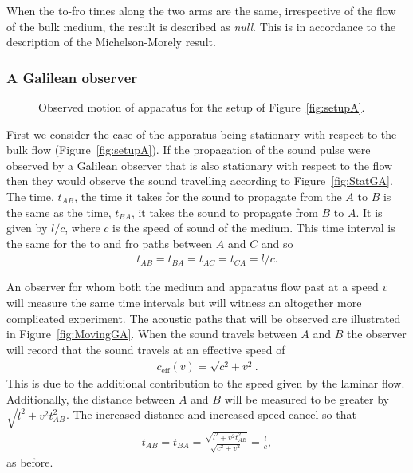 \documentclass[10pt, fleqn,final,showtrims,oldfontcommands, article,a4paper,oneside]{memoir} %
\newcommand{\figref}[1]{Figure~\ref{fig:#1}}
\newcommand{\eff}{{\textrm{eff}}}
\begin{document}
When the to-fro times along the two arms are the same, irrespective of the flow  of the bulk medium,  the result is described as {\em null}.
This is in accordance to the description of the Michelson-Morely result.

\subsubsection{A Galilean observer}\label{sec:MMGalilean}

 \begin{figure}[t]
      \centering
\hspace{2cm}
\label{fig:GalileanA}
      \caption{Observed motion of apparatus for the setup of \figref{setupA}.}
 \end{figure}

First we consider the case of the apparatus being stationary with respect to the bulk flow (\figref{setupA}).
If the propagation of the sound pulse were observed by a Galilean observer that is also stationary with respect to the flow
then they would observe the sound travelling according to \figref{StatGA}.
The time, $t_{AB}$, the time it takes for the sound to propagate from the $A$ to $B$ is the same as the time, $t_{BA}$, it takes the sound to propagate from $B$ to $A$.
It is given by $l/c$, where  $c$ is the speed of sound of the medium.
This time interval is the same for the to and fro paths between $A$ and $C$ and so
\begin{align}
  t_{AB}=t_{BA}=t_{AC}=t_{CA}=l/c\label{eqn:setupA:stationary:Tab}.
\end{align}

An observer for whom  both the medium and apparatus flow past at a speed $v$ will measure the same time intervals 
but will witness an altogether more complicated experiment.
The acoustic paths that will be observed are illustrated in \figref{MovingGA}.
When the sound travels between $A$ and $B$ the observer will record that the sound travels at an effective speed of
\begin{align}
\label{eqn:ceffone}
c_\eff(v) = \sqrt{c^2 +v^2}.
\end{align}
This is due to the additional contribution to the speed given by the  laminar flow.
Additionally, the distance between $A$ and $B$ will be measured to be greater by  $\sqrt{l^2+v^2t_{AB}^2}$.
The increased distance and increased speed cancel so that 
\begin{align}
  \label{eqn:setupA:moving:Tab}
  t_{AB} = t_{BA} = \frac{\sqrt{l^2+v^2t_{AB}^2}}{\sqrt{c^2 +v^2}} = \frac{l}{c},
\end{align}
as before.
\end{document}
